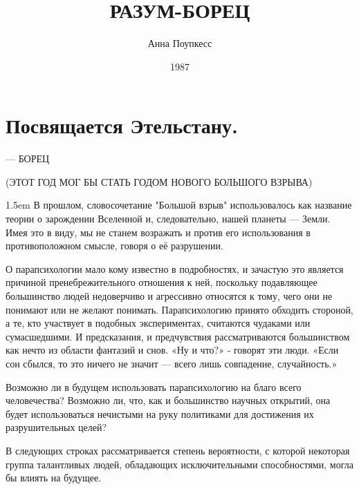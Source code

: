 \documentclass[a4paper,12pt]{book}
\begin{document}
\begingroup
\title{РАЗУМ-БОРЕЦ}
\author{Анна Поупкесс}
\date{1987}
\maketitle
\endgroup

\tableofcontents

\chapter*{Посвящается Этельстану.}
\newpage
\begin{center}
 — БОРЕЦ\\
\end{center}
\par
\noindent(ЭТОТ ГОД МОГ БЫ СТАТЬ ГОДОМ НОВОГО БОЛЬШОГО ВЗРЫВА)\\
\par
\emergencystretch 1.5em
\hfuzz 0.3pt
В прошлом, словосочетание "Большой взрыв" использовалось как название теории о зарождении Вселенной и, следовательно, нашей планеты — Земли. Имея это в виду, мы не станем возражать и против его использования в противоположном смысле, говоря о её разрушении.\\
\par
О парапсихологии мало кому известно в подробностях, и зачастую это является причиной пренебрежительного отношения к ней, поскольку подавляющее большинство людей недоверчиво и агрессивно относятся к тому, чего они не понимают или не желают понимать. Парапсихологию принято обходить стороной, а те, кто участвует в подобных экспериментах, считаются чудаками или сумасшедшими. И предсказания, и предчувствия рассматриваются большинством как нечто из области фантазий и снов. «Ну и что?» - говорят эти люди. «Если сон сбылся, то это ничего не значит — всего лишь совпадение, случайность.»\\
\par
Возможно ли в будущем использовать парапсихологию на благо всего человечества? Возможно ли, что, как и большинство научных открытий, она будет использоваться нечистыми на руку политиками для достижения их разрушительных целей?\\
\par
В следующих строках рассматривается степень вероятности, с которой некоторая группа талантливых людей, обладающих исключительными способностями, могла бы влиять на будущее.\\
\par
\end{document}
